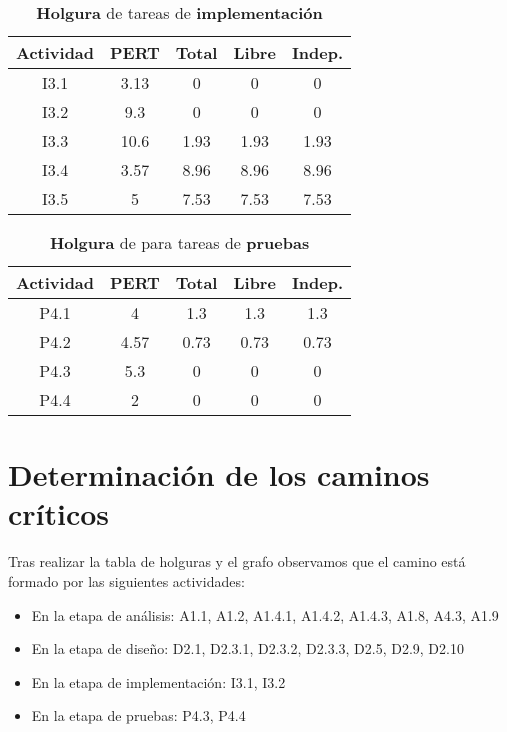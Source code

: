 \documentclass[11pt,a4paper,spanish,twoside]{report}
\begin{document}
\begin{table}[!h]
\centering
  \begin{tabular}{|c||c||c|c|c|}
    \hline
     \textbf{Actividad} & \textbf{PERT} & \textbf{Total} & \textbf{Libre}
    & \textbf{Indep.}\\
    \hline \hline
    I3.1 & 3.13 & 0 & 0 & 0\\
    \hline
    I3.2 & 9.3 & 0 & 0 & 0\\
    \hline
    I3.3 & 10.6 & 1.93 & 1.93 & 1.93\\
    \hline
    I3.4 & 3.57 & 8.96 & 8.96 & 8.96\\
    \hline
    I3.5 & 5 & 7.53 & 7.53 & 7.53\\
    \hline
  \end{tabular}
  \caption{\textbf{Holgura} de tareas de \textbf{implementación}}
  \label{Tab:HOLimp}
\end{table}

\begin{table}[!h]
\centering
  \begin{tabular}{|c||c||c|c|c|}
    \hline
     \textbf{Actividad} & \textbf{PERT} & \textbf{Total} & \textbf{Libre}
    & \textbf{Indep.}\\
    \hline \hline
    P4.1 & 4 & 1.3 & 1.3 & 1.3\\
    \hline
    P4.2 & 4.57 & 0.73 & 0.73 & 0.73\\
    \hline
    P4.3 & 5.3 & 0 & 0 & 0\\
    \hline
    P4.4 & 2 & 0 & 0 & 0\\
    \hline
  \end{tabular}
  \caption{\textbf{Holgura} de para tareas de \textbf{pruebas}}
  \label{Tab:HOLpru}
\end{table}

\section{Determinación de los caminos críticos}
Tras realizar la tabla de holguras y el grafo observamos que el camino está
formado por las siguientes actividades:
\begin{itemize}
\item En la etapa de análisis: A1.1, A1.2, A1.4.1, A1.4.2, A1.4.3, A1.8,
  A4.3, A1.9 
\item En la etapa de diseño: D2.1, D2.3.1, D2.3.2, D2.3.3, D2.5, D2.9, D2.10 
\item En la etapa de implementación: I3.1, I3.2
\item En la etapa de pruebas: P4.3, P4.4
\end{itemize}
\end{document}

